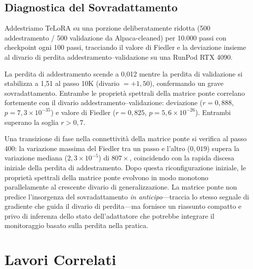 \documentclass[11pt]{article}
\begin{document}
\subsection{Diagnostica del Sovradattamento}
\label{sec:exp-overfit}

Addestriamo TeLoRA su una
porzione deliberatamente ridotta (500 addestramento / 500 validazione da
Alpaca-cleaned) per 10.000 passi con checkpoint ogni 100 passi,
tracciando il valore di Fiedler e la deviazione insieme al divario di
perdita addestramento--validazione su una RunPod RTX 4090.

La perdita di addestramento scende a 0,012 mentre la perdita di
validazione si stabilizza a 1,51 al passo 10K (divario $= +1{,}50$),
confermando un grave sovradattamento. Entrambe le propriet\`a spettrali
della matrice ponte correlano fortemente con il divario
addestramento--validazione: deviazione ($r = 0{,}888$,
$p = 7{,}3 \times 10^{-35}$) e valore di Fiedler ($r = 0{,}825$,
$p = 5{,}6 \times 10^{-26}$). Entrambi superano la soglia $r > 0{,}7$.

Una transizione di fase nella connettivit\`a della matrice ponte si
verifica al passo 400: la variazione massima del Fiedler tra un passo
e l'altro ($0{,}019$) supera la variazione mediana
($2{,}3 \times 10^{-5}$) di $807\times$, coincidendo con la rapida
discesa iniziale della perdita di addestramento. Dopo questa
riconfigurazione iniziale, le propriet\`a spettrali della matrice ponte
evolvono in modo monotono parallelamente al crescente divario di
generalizzazione. La matrice ponte non predice l'insorgenza del
sovradattamento \emph{in anticipo}---traccia lo stesso segnale di
gradiente che guida il divario di perdita---ma fornisce un riassunto
compatto e privo di inferenza dello stato dell'adattatore che potrebbe
integrare il monitoraggio basato sulla perdita nella pratica.


\section{Lavori Correlati}
\label{sec:related}
\end{document}
